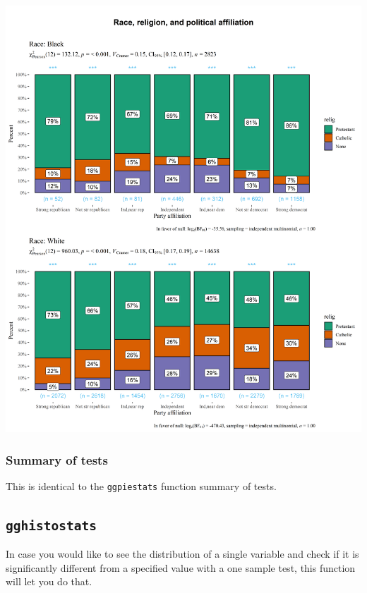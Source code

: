 \documentclass[]{article}
\begin{document}
\includegraphics[width=1\linewidth]{./figures/paper-ggbarstats2-1}

\hypertarget{summary-of-tests-4}{%
\subsubsection{Summary of tests}\label{summary-of-tests-4}}

This is identical to the \texttt{ggpiestats} function summary of tests.

\hypertarget{gghistostats}{%
\subsection{\texorpdfstring{\texttt{gghistostats}}{gghistostats}}\label{gghistostats}}

In case you would like to see the distribution of a single variable and
check if it is significantly different from a specified value with a one
sample test, this function will let you do that.
\end{document}
